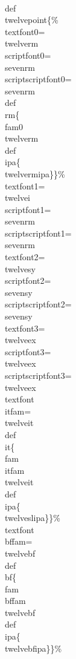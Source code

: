 \\def\\twelvepoint\{\%
  \\textfont0=\\twelverm
      \\scriptfont0=\\sevenrm  \\scriptscriptfont0=\\sevenrm
  \\def\\rm\{\\fam0\\twelverm\\def\\ipa\{\\twelvermipa\}\}\%
  \\textfont1=\\twelvei
  \\scriptfont1=\\sevenrm  \\scriptscriptfont1=\\sevenrm
  \\textfont2=\\twelvesy
  \\scriptfont2=\\sevensy   \\scriptscriptfont2=\\sevensy
  \\textfont3=\\twelveex
  \\scriptfont3=\\twelveex  \\scriptscriptfont3=\\twelveex
  \\textfont\\itfam=\\twelveit
  \\def\\it\{\\fam\\itfam\\twelveit\\def\\ipa\{\\twelveslipa\}\}\%
  \\textfont\\bffam=\\twelvebf
  \\def\\bf\{\\fam\\bffam\\twelvebf\\def\\ipa\{\\twelvebfipa\}\}\%
